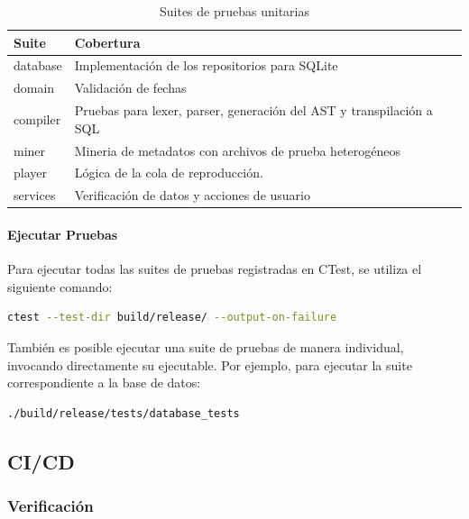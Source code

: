 \begin{table}[htbp]
	\centering
	\begin{tabularx}{\textwidth}{@{}lX@{}}
		\toprule
		Suite    & Cobertura                                                            \\
		\midrule
		database & Implementación de los repositorios para SQLite                       \\
		domain   & Validación de fechas                                                 \\
		compiler & Pruebas para lexer, parser, generación del AST y transpilación a SQL \\
		miner    & Mineria de metadatos con archivos de prueba heterogéneos             \\
		player   & Lógica de la cola de reproducción.                                   \\
		services & Verificación de datos y acciones de usuario                          \\
		\bottomrule
	\end{tabularx}
	\caption{Suites de pruebas unitarias}
\end{table}

\paragraph{Ejecutar Pruebas}

Para ejecutar todas las suites de pruebas registradas en CTest,
se utiliza el siguiente comando:

\begin{lstlisting}[language=bash]
ctest --test-dir build/release/ --output-on-failure
\end{lstlisting}

También es posible ejecutar una suite de pruebas de manera
individual, invocando directamente su ejecutable. Por ejemplo,
para ejecutar la suite correspondiente a la base de datos:

\begin{lstlisting}[language=bash]
./build/release/tests/database_tests
\end{lstlisting}

\subsection{CI/CD}

\subsubsection*{Verificación}

